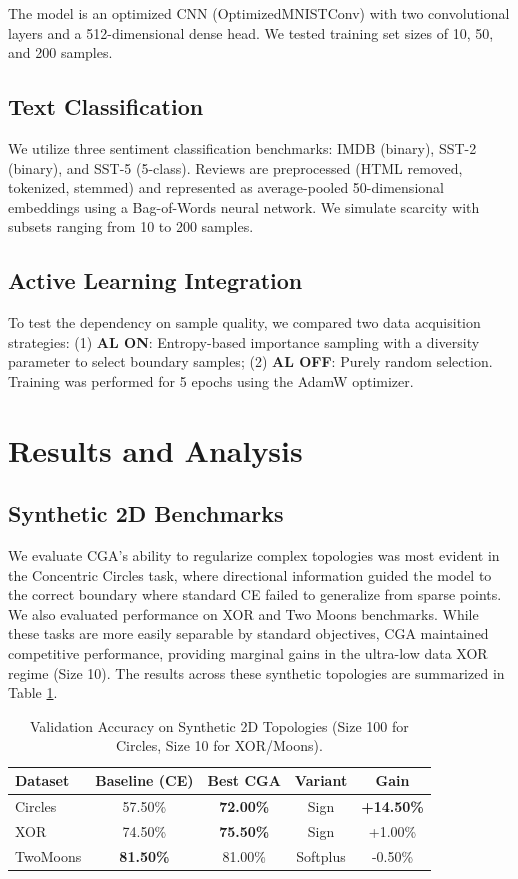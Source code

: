 \documentclass[sigconf,anonymous]{aamas}
\begin{document}
The model is an optimized CNN (OptimizedMNISTConv) with two convolutional layers and a 512-dimensional dense head. We tested training set sizes of 10, 50, and 200 samples.

\subsection{Text Classification}
We utilize three sentiment classification benchmarks: IMDB (binary), SST-2 (binary), and SST-5 (5-class). Reviews are preprocessed (HTML removed, tokenized, stemmed) and represented as average-pooled 50-dimensional embeddings using a Bag-of-Words neural network. We simulate scarcity with subsets ranging from 10 to 200 samples.

\subsection{Active Learning Integration}
To test the dependency on sample quality, we compared two data acquisition strategies: (1) \textbf{AL ON}: Entropy-based importance sampling with a diversity parameter to select boundary samples; (2) \textbf{AL OFF}: Purely random selection. Training was performed for 5 epochs using the AdamW optimizer.

\section{Results and Analysis}


\subsection{Synthetic 2D Benchmarks}
We evaluate CGA's ability to regularize complex topologies was most evident in the Concentric Circles task, where directional information guided the model to the correct boundary where standard CE failed to generalize from sparse points. We also evaluated performance on XOR and Two Moons benchmarks. While these tasks are more easily separable by standard objectives, CGA maintained competitive performance, providing marginal gains in the ultra-low data XOR regime (Size 10). The results across these synthetic topologies are summarized in Table \ref{tab:2d_results}.

\begin{table}[h]
\centering
\caption{Validation Accuracy on Synthetic 2D Topologies (Size 100 for Circles, Size 10 for XOR/Moons).}
\label{tab:2d_results}
\begin{tabular}{@{}lcccc@{}}
\toprule
\textbf{Dataset} & \textbf{Baseline (CE)} & \textbf{Best CGA} & \textbf{Variant} & \textbf{Gain} \\ \midrule
Circles & 57.50\% & \textbf{72.00\%} & Sign & \textbf{+14.50\%} \\
XOR     & 74.50\% & \textbf{75.50\%} & Sign & +1.00\% \\
TwoMoons & \textbf{81.50\%} & 81.00\% & Softplus & -0.50\% \\ \bottomrule
\end{tabular}
\end{table}
\end{document}
